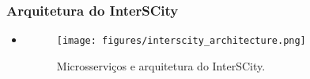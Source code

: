 \begin{frame}
    \frametitle{Arquitetura do InterSCity}
    \begin{itemize}
        \item
            \begin{figure}
                \texttt{[image: figures/interscity\_architecture.png]}
                \caption{Microsserviços e arquitetura do InterSCity.}
            \end{figure}
    \end{itemize}
\end{frame}
